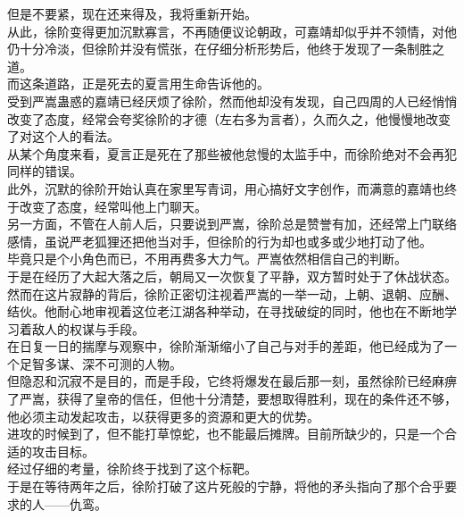 \begin{multicols}{\theparacolNo}
但是不要紧，现在还来得及，我将重新开始。\\

从此，徐阶变得更加沉默寡言，不再随便议论朝政，可嘉靖却似乎并不领情，对他仍十分冷淡，但徐阶并没有慌张，在仔细分析形势后，他终于发现了一条制胜之道。\\

而这条道路，正是死去的夏言用生命告诉他的。\\

受到严嵩蛊惑的嘉靖已经厌烦了徐阶，然而他却没有发现，自己四周的人已经悄悄改变了态度，经常会夸奖徐阶的才德（左右多为言者），久而久之，他慢慢地改变了对这个人的看法。\\

从某个角度来看，夏言正是死在了那些被他怠慢的太监手中，而徐阶绝对不会再犯同样的错误。\\

此外，沉默的徐阶开始认真在家里写青词，用心搞好文字创作，而满意的嘉靖也终于改变了态度，经常叫他上门聊天。\\

另一方面，不管在人前人后，只要说到严嵩，徐阶总是赞誉有加，还经常上门联络感情，虽说严老狐狸还把他当对手，但徐阶的行为却也或多或少地打动了他。\\

毕竟只是个小角色而已，不用再费多大力气。严嵩依然相信自己的判断。\\

于是在经历了大起大落之后，朝局又一次恢复了平静，双方暂时处于了休战状态。\\

然而在这片寂静的背后，徐阶正密切注视着严嵩的一举一动，上朝、退朝、应酬、结伙。他耐心地审视着这位老江湖各种举动，在寻找破绽的同时，他也在不断地学习着敌人的权谋与手段。\\

在日复一日的揣摩与观察中，徐阶渐渐缩小了自己与对手的差距，他已经成为了一个足智多谋、深不可测的人物。\\

但隐忍和沉寂不是目的，而是手段，它终将爆发在最后那一刻，虽然徐阶已经麻痹了严嵩，获得了皇帝的信任，但他十分清楚，要想取得胜利，现在的条件还不够，他必须主动发起攻击，以获得更多的资源和更大的优势。\\

进攻的时候到了，但不能打草惊蛇，也不能最后摊牌。目前所缺少的，只是一个合适的攻击目标。\\

经过仔细的考量，徐阶终于找到了这个标靶。\\

于是在等待两年之后，徐阶打破了这片死般的宁静，将他的矛头指向了那个合乎要求的人——仇鸾。\\
\ifnum{}
	\end{multicols}
\fi
\newpage
